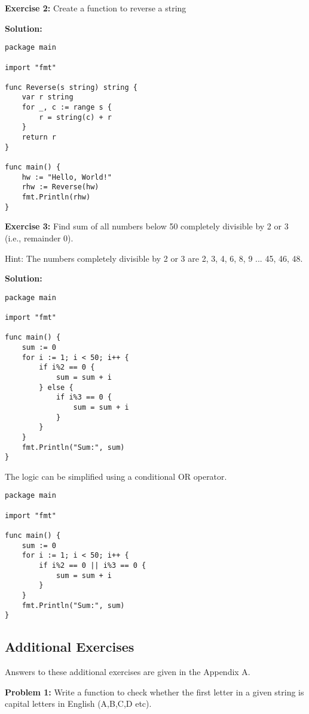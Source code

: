 \textbf{Exercise 2:} Create a function to reverse a string

\textbf{Solution:}

\begin{lstlisting}[numbers=none]
package main

import "fmt"

func Reverse(s string) string {
    var r string
    for _, c := range s {
        r = string(c) + r
    }
    return r
}

func main() {
    hw := "Hello, World!"
    rhw := Reverse(hw)
    fmt.Println(rhw)
}
\end{lstlisting}

\textbf{Exercise 3:} Find sum of all numbers below 50 completely divisible
by 2 or 3 (i.e., remainder 0).

Hint: The numbers completely divisible by 2 or 3 are 2, 3, 4, 6, 8, 9 ... 45,
46, 48.

\textbf{Solution:}

\begin{lstlisting}[numbers=none]
package main

import "fmt"

func main() {
    sum := 0
    for i := 1; i < 50; i++ {
        if i%2 == 0 {
            sum = sum + i
        } else {
            if i%3 == 0 {
                sum = sum + i
            }
        }
    }
    fmt.Println("Sum:", sum)
}
\end{lstlisting}

The logic can be simplified using a conditional OR operator.

\begin{lstlisting}[numbers=none]
package main

import "fmt"

func main() {
    sum := 0
    for i := 1; i < 50; i++ {
        if i%2 == 0 || i%3 == 0 {
            sum = sum + i
        }
    }
    fmt.Println("Sum:", sum)
}
\end{lstlisting}

\subsection{Additional Exercises}

Answers to these additional exercises are given in the Appendix A.

\textbf{Problem 1:} Write a function to check whether the first letter in a
given string is capital letters in English (A,B,C,D etc).

